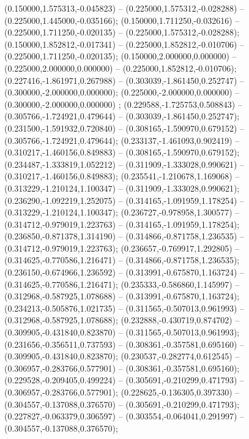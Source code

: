  (0.150000,1.575313,-0.045823) -- (0.225000,1.575312,-0.028288) -- (0.225000,1.445000,-0.035166);
 (0.150000,1.711250,-0.032616) -- (0.225000,1.711250,-0.020135) -- (0.225000,1.575312,-0.028288);
 (0.150000,1.852812,-0.017341) -- (0.225000,1.852812,-0.010706) -- (0.225000,1.711250,-0.020135);
 (0.150000,2.000000,0.000000) -- (0.225000,2.000000,0.000000) -- (0.225000,1.852812,-0.010706);
 (0.227416,-1.861971,0.267988) -- (0.303039,-1.861450,0.252747) -- (0.300000,-2.000000,0.000000);
 (0.225000,-2.000000,0.000000) -- (0.300000,-2.000000,0.000000) ;
 (0.229588,-1.725753,0.508843) -- (0.305766,-1.724921,0.479644) -- (0.303039,-1.861450,0.252747);
 (0.231500,-1.591932,0.720840) -- (0.308165,-1.590970,0.679152) -- (0.305766,-1.724921,0.479644);
 (0.233137,-1.461093,0.902419) -- (0.310217,-1.460156,0.849883) -- (0.308165,-1.590970,0.679152);
 (0.234487,-1.333819,1.052212) -- (0.311909,-1.333028,0.990621) -- (0.310217,-1.460156,0.849883);
 (0.235541,-1.210678,1.169068) -- (0.313229,-1.210124,1.100347) -- (0.311909,-1.333028,0.990621);
 (0.236290,-1.092219,1.252075) -- (0.314165,-1.091959,1.178254) -- (0.313229,-1.210124,1.100347);
 (0.236727,-0.978958,1.300577) -- (0.314712,-0.979019,1.223763) -- (0.314165,-1.091959,1.178254);
 (0.236850,-0.871378,1.314190) -- (0.314866,-0.871758,1.236535) -- (0.314712,-0.979019,1.223763);
 (0.236657,-0.769917,1.292805) -- (0.314625,-0.770586,1.216471) -- (0.314866,-0.871758,1.236535);
 (0.236150,-0.674966,1.236592) -- (0.313991,-0.675870,1.163724) -- (0.314625,-0.770586,1.216471);
 (0.235333,-0.586860,1.145997) -- (0.312968,-0.587925,1.078688) -- (0.313991,-0.675870,1.163724);
 (0.234213,-0.505876,1.021735) -- (0.311565,-0.507013,0.961993) -- (0.312968,-0.587925,1.078688);
 (0.232888,-0.430719,0.874702) -- (0.309905,-0.431840,0.823870) -- (0.311565,-0.507013,0.961993);
 (0.231656,-0.356511,0.737593) -- (0.308361,-0.357581,0.695160) -- (0.309905,-0.431840,0.823870);
 (0.230537,-0.282774,0.612545) -- (0.306957,-0.283766,0.577901) -- (0.308361,-0.357581,0.695160);
 (0.229528,-0.209405,0.499224) -- (0.305691,-0.210299,0.471793) -- (0.306957,-0.283766,0.577901);
 (0.228625,-0.136305,0.397330) -- (0.304557,-0.137088,0.376570) -- (0.305691,-0.210299,0.471793);
 (0.227827,-0.063379,0.306597) -- (0.303554,-0.064041,0.291997) -- (0.304557,-0.137088,0.376570);
